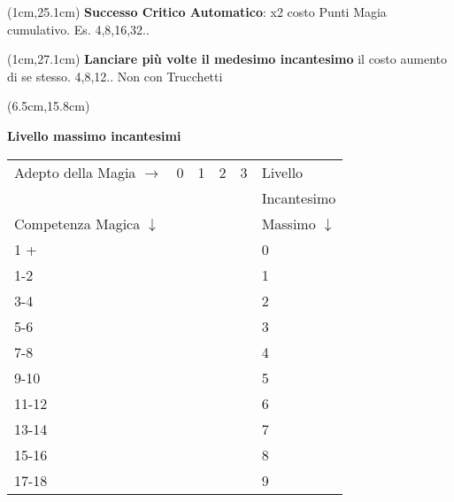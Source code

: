 \documentclass[a4paper,12 pt,openany]{book}
\begin{document}
\begin{textblock*}{5cm}(1cm,25.1cm) %
{\small
\textbf{Successo Critico Automatico}:  x2 costo Punti Magia cumulativo. Es. 4,8,16,32..}
\end{textblock*}

\begin{textblock*}{5cm}(1cm,27.1cm) %
{\small\textbf{Lanciare più volte il medesimo incantesimo} il costo aumento di se stesso. 4,8,12.. Non con Trucchetti}
\end{textblock*}

\begin{textblock*}{13.5cm}(6.5cm,15.8cm) %

\textbf{Livello massimo incantesimi}
{\small
\medskip
\begin{tabular}{ll|l|l|l|l}
	\hline
Adepto della Magia $\rightarrow$&0&1&2&3&Livello\\
	&&&&&Incantesimo\\
	Competenza Magica $\downarrow$&&&&&Massimo $\downarrow$\\
	1 + & \checkmark &  \checkmark & \checkmark & \checkmark & 0\\
	1-2 &  &\checkmark & \checkmark& \checkmark &   1\\
	3-4 &  &\checkmark & \checkmark & \checkmark &   2\\
	5-6 &  &\checkmark & \checkmark & \checkmark &   3\\
	7-8 &  & \checkmark & \checkmark & \checkmark &   4\\
	9-10 &  &     & \checkmark & \checkmark &   5\\
	11-12 &  &     & \checkmark& \checkmark &   6\\
	13-14 &  &     & \checkmark& \checkmark &   7\\
	15-16 &  &     &  & \checkmark &   8\\
	17-18 &  &     &    & \checkmark &   9\\
\end{tabular}}
\end{textblock*}
\end{document}

